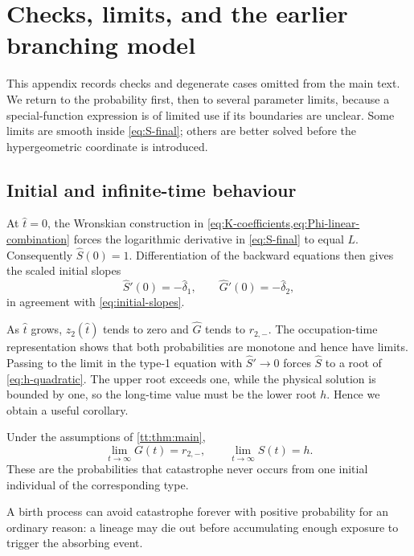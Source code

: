 \section{Checks, limits, and the earlier branching model}
\label{app:limits}

This appendix records checks and degenerate cases omitted from the main text. We return to the probability first, then to several parameter limits, because a special-function expression is of limited use if its boundaries are unclear. Some limits are smooth inside \cref{eq:S-final}; others are better solved before the hypergeometric coordinate is introduced.

\subsection{Initial and infinite-time behaviour}

At $\hat t=0$, the Wronskian construction in \cref{eq:K-coefficients,eq:Phi-linear-combination} forces the logarithmic derivative in \cref{eq:S-final} to equal $L$. Consequently $\widehat S(0)=1$. Differentiation of the backward equations then gives the scaled initial slopes
\begin{equation*}
\widehat S'(0)=-\hat\delta_1,
\qquad
\widehat G'(0)=-\hat\delta_2,
\end{equation*}
in agreement with \cref{eq:initial-slopes}.

As $\hat t$ grows, $z_2(\hat t)$ tends to zero and $\widehat G$ tends to $r_{2,-}$. The occupation-time representation shows that both probabilities are monotone and hence have limits. Passing to the limit in the type-1 equation with $\widehat S'\to0$ forces $\widehat S$ to a root of \cref{eq:h-quadratic}. The upper root exceeds one, while the physical solution is bounded by one, so the long-time value must be the lower root $h$. Hence we obtain a useful corollary.

\begin{corollary}
\label{cor:long-time}
Under the assumptions of \cref{tt:thm:main},
\begin{equation*}
\lim_{t\to\infty}G(t)=r_{2,-},
\qquad
\lim_{t\to\infty}S(t)=h.
\end{equation*}
These are the probabilities that catastrophe never occurs from one initial individual of the corresponding type.
\end{corollary}

A birth process can avoid catastrophe forever with positive probability for an ordinary reason: a lineage may die out before accumulating enough exposure to trigger the absorbing event.

